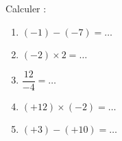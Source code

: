 
\begin{exercice}\label{exosmath-0825}

    Calculer :
    \begin{enumerate}
        \item
            \( (-1)-(-7)=\ldots\)
        \item
            \( (-2)\times 2=\ldots\)
        \item
            \( \dfrac{ 12 }{ -4 }=\ldots\)
        \item
            \( (+12)\times (-2)=\ldots\)
        \item
            \( (+3)-(+10)=\ldots\)
    \end{enumerate}


\end{exercice}
